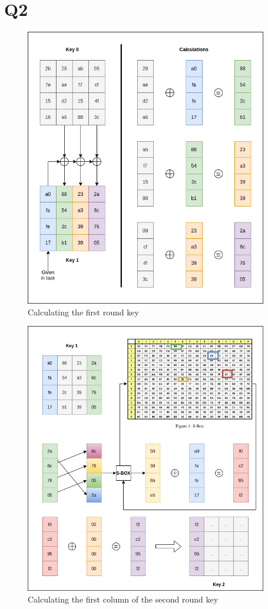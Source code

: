 \documentclass{article}
\begin{document}
\newpage
\section{Q2}


\begin{figure}[H]
 \centering
  \includegraphics[width=300pt]{img/AESKey1.png}
 \caption{Calculating the first round key}
 \end{figure}

\begin{figure}[H]
 \centering
  \includegraphics[width=300pt]{img/AESKey2.png}
 \caption{Calculating the first column of the second round key}
 \end{figure}
\end{document}
